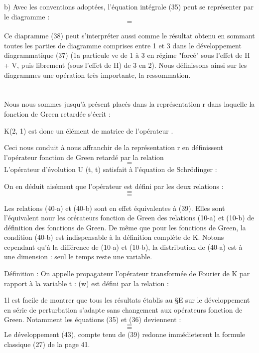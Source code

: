 b) Avec les conventions adoptées, l'équation intégrale (35) peut se
représenter par le diagramme :
\[
\tag{38}=
\]

Ce diapramme (38) peut s'interpréter aussi comme le résultat obtenu en
sommant toutes les parties de diagramme comprises entre 1 et 3 dans le
développement diagrammatique (37) (1a particule ve de 1 à 3 en régime
"forcé" sous l'effet de H + V, puis librement (sous l'effet de H) de
3 en 2). Nous définissons ainsi sur les diagrammes une opération très
importante, la ressommation.

\section{}%

\subsection{}%

Nous nous sommes jusqu'à présent placés dans la représentation r
dans laquelle la fonction de Green retardée s'écrit :

K(2, 1) est donc un élément de matrice de l'opérateur .


Ceci nous conduit à nous affranchir de la représentation r en définissent
l'opérateur fonction de Green retardé par la relation
\[
\tag{39}=
\]
L'opérateur d'évolution U (t, t) satisfait à l'équation de Schrödinger :

On en déduit aisément que l'opérateur  est défini par les
deux relations :
\[
\tag{40-a}=
\]
\[
\tag{40-b}=
\]

Les relations (40-a) et (40-b) sont en effet équivalentes à (39). Elles
sont l'équivalent nour les orérateurs fonction de Green des relations
(10-a) et (10-b) de définition des fonctions de Green. De même que pour
les fonctions de Green, la condition (40-b) est indispensable à la définition
complète de K. Notons cependant qu'à la différence de (10-a) et
(10-b), la distribution  de (40-a) est à une dimension : seul le temps
reste une variable.

Définition : On appelle propagateur  l'opérateur transformée de
Fourier de K par rapport à la variable t : (w) est défini par la
relation :

1l est facile de montrer que tous les résultats établis au \S E sur le
développement en série de perturbation s'adapte sans changement aux opérateurs
fonction de Green. Notamment les équations (35) et (36) deviennent :
\[
\tag{42}=
\]
\[
\tag{43}=
\]
Le développement (43), compte tenu de (39) redonne immédieterent la formule
classique (27) de la page 41.

